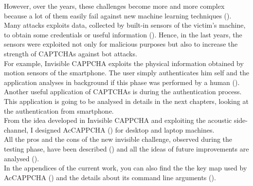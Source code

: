 However, over the years, these challenges become more and more complex because a lot of them easily fail against new machine learning techniques ().\\
Many attacks exploits data, collected by built-in sensors of the victim's machine, to obtain some credentials or useful information (). Hence, in the last years, the sensors were exploited not only for malicious purposes but also to increase the strength of CAPTCHAs against bot attacks.\\
For example, Invisible CAPPCHA exploits the physical information obtained by motion sensors of the smartphone. The user simply authenticates him self and the application analyses in background if this phase was performed by a human  ().\\
Another useful application of CAPTCHAs is during the authentication process. This application is going to be analysed in details in the next chapters, looking at the authentication from smartphone.\\
From the idea developed in Invisible CAPPCHA and exploiting the acoustic side-channel, I designed AcCAPPCHA () for desktop and laptop machines.\\
All the pros and the cons of the new invisible challenge, observed during the testing phase, have been described () and all the ideas of future improvements are analysed ().\\
In the appendices of the current work, you can also find the the key map used by AcCAPPCHA () and the details about its command line arguments ().